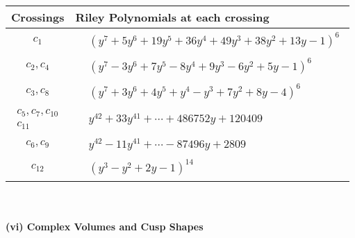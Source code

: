 \documentclass[1p]{elsarticle_modified}
\theoremstyle{definition}
\begin{document}
\begin{tabular}{m{50pt}|m{274pt}}
Crossings & \hspace{64pt}Riley Polynomials at each crossing \\
\hline $$\begin{aligned}c_{1}\end{aligned}$$&$\begin{aligned}
&(y^7+5 y^6+19 y^5+36 y^4+49 y^3+38 y^2+13 y-1)^6
\end{aligned}$\\
\hline $$\begin{aligned}c_{2},c_{4}\end{aligned}$$&$\begin{aligned}
&(y^7-3 y^6+7 y^5-8 y^4+9 y^3-6 y^2+5 y-1)^6
\end{aligned}$\\
\hline $$\begin{aligned}c_{3},c_{8}\end{aligned}$$&$\begin{aligned}
&(y^7+3 y^6+4 y^5+y^4- y^3+7 y^2+8 y-4)^6
\end{aligned}$\\
\hline $$\begin{aligned}c_{5},c_{7},c_{10}\\c_{11}\end{aligned}$$&$\begin{aligned}
&y^{42}+33 y^{41}+\cdots+486752 y+120409
\end{aligned}$\\
\hline $$\begin{aligned}c_{6},c_{9}\end{aligned}$$&$\begin{aligned}
&y^{42}-11 y^{41}+\cdots-87496 y+2809
\end{aligned}$\\
\hline $$\begin{aligned}c_{12}\end{aligned}$$&$\begin{aligned}
&(y^3- y^2+2 y-1)^{14}
\end{aligned}$\\
\hline
\end{tabular}\\~\\
\newpage\flushleft \textbf{(vi) Complex Volumes and Cusp Shapes}
\end{document}
